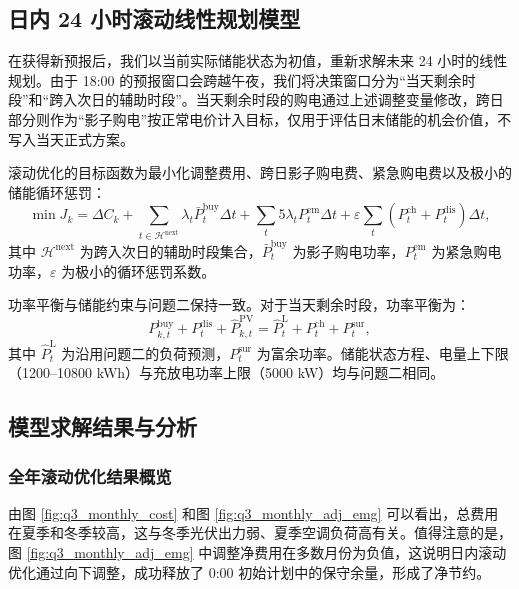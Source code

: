\documentclass[withoutpreface,bwprint]{cumcmthesis}
\begin{document}
\subsection{日内 24 小时滚动线性规划模型}

在获得新预报后，我们以当前实际储能状态为初值，重新求解未来 24 小时的线性规划。由于 18:00 的预报窗口会跨越午夜，我们将决策窗口分为“当天剩余时段”和“跨入次日的辅助时段”。当天剩余时段的购电通过上述调整变量修改，跨日部分则作为“影子购电”按正常电价计入目标，仅用于评估日末储能的机会价值，不写入当天正式方案。

滚动优化的目标函数为最小化调整费用、跨日影子购电费、紧急购电费以及极小的储能循环惩罚：
\begin{equation}
	\min J_k = \Delta C_k + \sum_{t \in \mathcal{H}^{\mathrm{next}}} \lambda_t \bar{P}^{\mathrm{buy}}_t \Delta t + \sum_{t} 5\lambda_t P^{\mathrm{em}}_t \Delta t + \varepsilon \sum_{t} (P^{\mathrm{ch}}_t + P^{\mathrm{dis}}_t) \Delta t,
	\label{eq:q3obj}
\end{equation}
其中 $\mathcal{H}^{\mathrm{next}}$ 为跨入次日的辅助时段集合，$\bar{P}^{\mathrm{buy}}_t$ 为影子购电功率，$P^{\mathrm{em}}_t$ 为紧急购电功率，$\varepsilon$ 为极小的循环惩罚系数。

功率平衡与储能约束与问题二保持一致。对于当天剩余时段，功率平衡为：
\begin{equation}
	P^{\mathrm{buy}}_{k,t} + P^{\mathrm{dis}}_t + \hat{P}^{\mathrm{PV}}_{k,t} = \hat{P}^{\mathrm{L}}_t + P^{\mathrm{ch}}_t + P^{\mathrm{sur}}_t,
	\label{eq:q3bal}
\end{equation}
其中 $\hat{P}^{\mathrm{L}}_t$ 为沿用问题二的负荷预测，$P^{\mathrm{sur}}_t$ 为富余功率。储能状态方程、电量上下限（1200--10800 kWh）与充放电功率上限（5000 kW）均与问题二相同。

\subsection{模型求解结果与分析}

\subsubsection{全年滚动优化结果概览}

由图 \ref{fig:q3_monthly_cost} 和图 \ref{fig:q3_monthly_adj_emg} 可以看出，总费用在夏季和冬季较高，这与冬季光伏出力弱、夏季空调负荷高有关。值得注意的是，图 \ref{fig:q3_monthly_adj_emg} 中调整净费用在多数月份为负值，这说明日内滚动优化通过向下调整，成功释放了 0:00 初始计划中的保守余量，形成了净节约。
\end{document}
